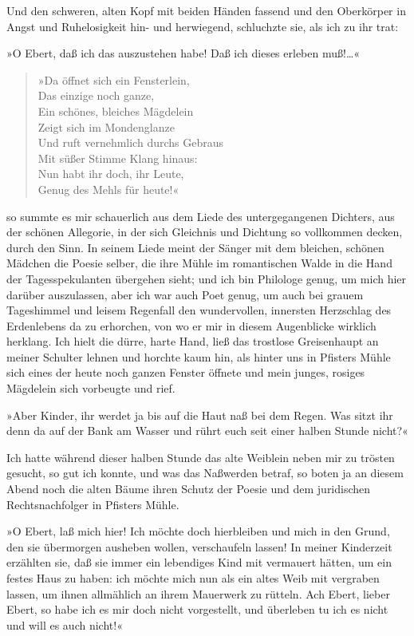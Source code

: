 Und den schweren, alten Kopf mit beiden Händen fassend und den
Oberkörper in Angst und Ruhelosigkeit hin- und herwiegend,
schluchzte sie, als ich zu ihr trat:

»O Ebert, daß ich das auszustehen habe! Daß ich dieses erleben
muß!\ldots{}«

\begin{verse}
»Da öffnet sich ein Fensterlein,\\
Das einzige noch ganze,\\
Ein schönes, bleiches Mägdelein\\
Zeigt sich im Mondenglanze\\
Und ruft vernehmlich durchs Gebraus\\
Mit süßer Stimme Klang hinaus:\\
Nun habt ihr doch, ihr Leute,\\
Genug des Mehls für heute!«
\end{verse}
\noindent
so summte es mir schauerlich aus dem Liede des
untergegangenen Dichters, aus der schönen Allegorie, in der sich
Gleichnis und Dichtung so vollkommen decken, durch den Sinn. In
seinem Liede meint der Sänger mit dem bleichen, schönen Mädchen die
Poesie selber, die ihre Mühle im romantischen Walde in die Hand der
Tagesspekulanten übergehen sieht; und ich bin Philologe genug, um
mich hier darüber auszulassen, aber ich war auch Poet genug, um
auch bei grauem Tageshimmel und leisem Regenfall den wundervollen,
innersten Herzschlag des Erdenlebens da zu erhorchen, von wo er mir
in diesem Augenblicke wirklich herklang. Ich hielt die dürre, harte
Hand, ließ das trostlose Greisenhaupt an meiner Schulter lehnen und
horchte kaum hin, als hinter uns in Pfisters Mühle sich eines der
heute noch ganzen Fenster öffnete und mein junges, rosiges
Mägdelein sich vorbeugte und rief.

»Aber Kinder, ihr werdet ja bis auf die Haut naß bei dem Regen. Was
sitzt ihr denn da auf der Bank am Wasser und rührt euch seit einer
halben Stunde nicht?«

Ich hatte während dieser halben Stunde das alte Weiblein neben mir
zu trösten gesucht, so gut ich konnte, und was das Naßwerden
betraf, so boten ja an diesem Abend noch die alten Bäume ihren
Schutz der Poesie und dem juridischen Rechtsnachfolger in Pfisters
Mühle.

»O Ebert, laß mich hier! Ich möchte doch hierbleiben und mich in
den Grund, den sie übermorgen ausheben wollen, verschaufeln lassen!
In meiner Kinderzeit erzählten sie, daß sie immer ein lebendiges
Kind mit vermauert hätten, um ein festes Haus zu haben: ich möchte
mich nun als ein altes Weib mit vergraben lassen, um ihnen
allmählich an ihrem Mauerwerk zu rütteln. Ach Ebert, lieber Ebert,
so habe ich es mir doch nicht vorgestellt, und überleben tu ich es
nicht und will es auch nicht!«

